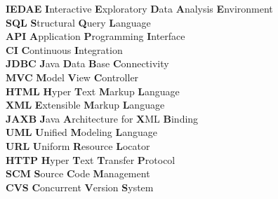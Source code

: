 \documentclass{report}
\begin{document}
\noindent
\textbf{IEDAE} \hspace{20 mm} \textbf{I}nteractive \textbf{E}xploratory \textbf{D}ata \textbf{A}nalysis \textbf{E}nvironment\\
\textbf{SQL} \hspace{25 mm} \textbf{S}tructural \textbf{Q}uery \textbf{L}anguage \\
\textbf{API} \hspace{25 mm} \textbf{A}pplication \textbf{P}rogramming \textbf{I}nterface \\
\textbf{CI} \hspace{28 mm} \textbf{C}ontinuous \textbf{I}ntegration \\
\textbf{JDBC} \hspace{22 mm} \textbf{J}ava \textbf{D}ata \textbf{B}ase \textbf{C}onnectivity \\
\textbf{MVC} \hspace{23 mm} \textbf{M}odel \textbf{V}iew \textbf{C}ontroller \\
\textbf{HTML} \hspace{20.5 mm} \textbf{H}yper \textbf{T}ext \textbf{M}arkup \textbf{L}anguage \\
\textbf{XML} \hspace{23.5 mm} \textbf{E}xtensible \textbf{M}arkup \textbf{L}anguage \\
\textbf{JAXB} \hspace{22 mm} \textbf{J}ava \textbf{A}rchitecture for \textbf{X}ML \textbf{B}inding \\
\textbf{UML} \hspace{23.5 mm} \textbf{U}nified \textbf{M}odeling \textbf{L}anguage \\
\textbf{URL} \hspace{24.5 mm} \textbf{U}niform \textbf{R}esource \textbf{L}ocator \\
\textbf{HTTP} \hspace{21.5 mm} \textbf{H}yper \textbf{T}ext \textbf{T}ransfer \textbf{P}rotocol \\
\textbf{SCM} \hspace{24.5 mm} \textbf{S}ource \textbf{C}ode \textbf{M}anagement \\
\textbf{CVS} \hspace{25 mm} \textbf{C}oncurrent \textbf{V}ersion \textbf{S}ystem \\



\end{document}
